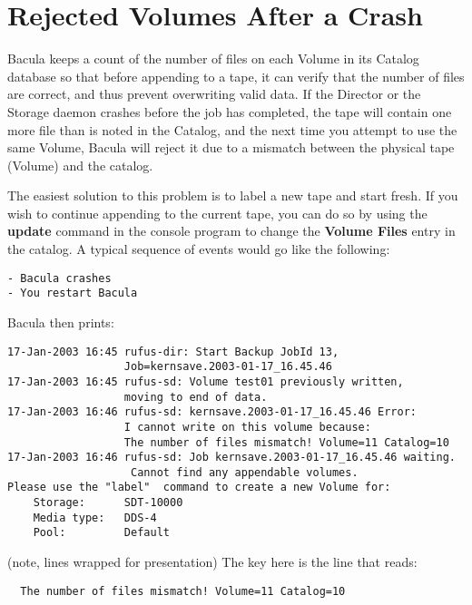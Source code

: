 \section{Rejected Volumes After a Crash}
\label{RejectedVolumes}

Bacula keeps a count of the number of files on each Volume in its Catalog
database so that before appending to a tape, it can verify that the number of
files are correct, and thus prevent overwriting valid data. If the Director or
the Storage daemon crashes before the job has completed, the tape will contain
one more file than is noted in the Catalog, and the next time you attempt to
use the same Volume, Bacula will reject it due to a mismatch between the
physical tape (Volume) and the catalog. 

The easiest solution to this problem is to label a new tape and start fresh.
If you wish to continue appending to the current tape, you can do so by using
the {\bf update} command in the console program to change the {\bf Volume
Files} entry in the catalog. A typical sequence of events would go like the
following: 

\footnotesize
\begin{verbatim}
- Bacula crashes
- You restart Bacula
\end{verbatim}
\normalsize

Bacula then prints: 

\footnotesize
\begin{verbatim}
17-Jan-2003 16:45 rufus-dir: Start Backup JobId 13,
                  Job=kernsave.2003-01-17_16.45.46
17-Jan-2003 16:45 rufus-sd: Volume test01 previously written,
                  moving to end of data.
17-Jan-2003 16:46 rufus-sd: kernsave.2003-01-17_16.45.46 Error:
                  I cannot write on this volume because:
                  The number of files mismatch! Volume=11 Catalog=10
17-Jan-2003 16:46 rufus-sd: Job kernsave.2003-01-17_16.45.46 waiting.
                   Cannot find any appendable volumes.
Please use the "label"  command to create a new Volume for:
    Storage:      SDT-10000
    Media type:   DDS-4
    Pool:         Default
\end{verbatim}
\normalsize

(note, lines wrapped for presentation)
The key here is the line that reads: 

\footnotesize
\begin{verbatim}
  The number of files mismatch! Volume=11 Catalog=10
\end{verbatim}
\normalsize

